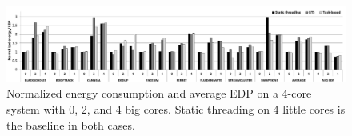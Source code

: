 \begin{figure}[t]%
	\centering
	\includegraphics[width=1.0\textwidth]{figures/energy_EDP-4.pdf}
	\vspace{-0.5cm}
	\caption{Normalized energy consumption and average EDP on a 4-core system with 0, 2, and 4 big cores. Static threading on 4 little cores is the baseline in both cases. }
	\label{fig:energy4}%
	\vspace{-0.3cm}
\end{figure}




